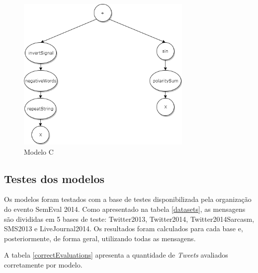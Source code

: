 \documentclass[12pt]{article}
\begin{document}
	\begin{figure}[H]
		\centering
		\includegraphics[width=0.75\textwidth]{treeC}
		\caption{Modelo C}
		\label{CModel}
	\end{figure}




\subsection{Testes dos modelos}

Os modelos foram testados com a base de testes disponibilizada pela organização do evento SemEval 2014. Como apresentado na tabela \ref{datasets}, as mensagens são divididas em 5 bases de teste: Twitter2013, Twitter2014, Twitter2014Sarcasm, SMS2013 e LiveJournal2014. Os resultados foram calculados para cada base e, posteriormente, de forma geral, utilizando todas as mensagens.

A tabela \ref{correctEvaluations} apresenta a quantidade de \emph{Tweets} avaliados corretamente por modelo. 
\end{document}
